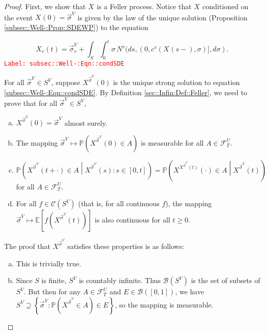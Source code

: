\documentclass[12pt]{article}
\newcommand{\mb}{\mathbb}
\newcommand{\mc}{\mathcal}
\newcommand{\ms}{\mathscr}
\newcommand{\tr}{\textcolor{red}}
\newcommand{\labe}[1]{\tr{\texttt{Label: #1}}}
\newcommand{\pr}{\mb{P}}							%
\newcommand{\ex}[1]{\mb{E}\left[#1\right]}			%
\renewcommand{\v}{v}							%
\renewcommand{\U}{U}							%
\renewcommand{\S}{S}							%
\newcommand{\s}{\sigma}							%
\newcommand{\sv}{\vec{\s}}						%
\newcommand{\T}{T}								%
\renewcommand{\t}{t}							%
\renewcommand{\tt}{s}							%
\newcommand{\F}{\mc{F}}							%
\newcommand{\X}{X}								%
\newcommand{\IGr}{c}							%
\newcommand{\vind}[1]{^{#1}}					%
\newcommand{\carp}[1]{^{#1}}					%
\newcommand{\vsi}[1]{^{#1}}						%
\newcommand{\cind}[1]{_{#1}}					%
\newcommand{\tp}[1]{(#1)}						%
\newcommand{\tip}[1]{#1}						%
\newcommand{\ts}[1]{_{#1}}						%
\newcommand{\cont}{\mc{C}}						%
\newcommand{\poiss}{N}							%
\newcommand{\pst}[1]{^{#1}}						%
\begin{document}
\begin{proof}
First, we show that \(\X\cind{}\tip{}\) is a Feller process. Notice that \(\X\cind{}\tip{}\) conditioned on the event \(\X\cind{}\tp{0} = \sv\cind{}\vsi{V}\) is given by the law of the unique solution (Proposition \ref{subsec::Well-:Prop::SDEWP}) to the equation

\begin{equation}
\X\cind{\v}\tp{\t} = \sv\cind{\v}\vsi{V} + \int_\S\int_0^\t \s\,\poiss\vind{\v}(d\tt,(0,\IGr\vind{\v}(\X\cind{}\tp{\tt-},\s)],d\s).
\label{subsec::Well-:Eqn::condSDE}
\end{equation}
\labe{subsec::Well-:Eqn::condSDE}

For all \(\sv\cind{}\vsi{V}\in\S\carp{V}\), suppose \(\X\pst{\sv\cind{}\vsi{V}}\cind{}\tp{0}\) is the unique strong solution to equation \eqref{subsec::Well-:Eqn::condSDE}. By Definition \ref{sec::Infin:Def::Feller}, we need to prove that for all \(\sv\cind{}\vsi{V}\in \S\carp{V}\),

\begin{enumerate}[(a)]
\item \(\X\pst{\sv\cind{}\vsi{V}}\cind{}\tp{0} = \sv\cind{}\vsi{V}\) almost surely.

\item The mapping \(\sv\cind{}\vsi{V}\mapsto \pr\left(\X\pst{\sv\cind{}\vsi{V}}\cind{}\tp{0}\in A\right)\) is measurable for all \(A\in \F\vsi{\U}\ts{\T}\).

\item \(\pr\left(\X\pst{\sv\cind{}\vsi{V}}\cind{}\tp{\t+\cdot}\in A\middle|\X\pst{\sv\cind{}\vsi{V}}\cind{}\tp{\tt}:\tt \in [0,\t]\right) = \pr\left(\X\pst{\X\pst{\sv\cind{}\vsi{V}}\cind{}\tp{\t}}\cind{}\tp{\cdot} \in A\middle| \X\pst{\sv\cind{}\vsi{V}}\cind{}\tp{\t} \right)\) for all \(A \in \F\vsi{\U}\ts{\T}\).

\item For all \(f \in \cont(\S\carp{V})\) (that is, for all continuous \(f\)), the mapping \(\sv\cind{}\vsi{V}\mapsto \ex{f(\X\pst{\sv\cind{}\vsi{V}}\cind{}\tp{\t})}\) is also continuous for all \(\t\geq 0\).
\end{enumerate}

The proof that \(\X\pst{\sv\cind{}\vsi{V}}\cind{}\tip{}\) satisfies these properties is as follows:

\begin{enumerate}[(a)]
\item This is trivially true.

\item Since \(\S\) is finite, \(\S\carp{V}\) is countably infinite. Thus \(\ms{B}(\S\carp{V})\) is the set of subsets of \(\S\carp{V}\). But then for any \(A \in \F\vsi{\U}\ts{\T}\) and \(E \in \ms{B}([0,1])\), we have \(\S\carp{V} \supseteq \left\{\sv\cind{}\vsi{V}: \pr\left(\X\pst{\sv\cind{}\vsi{V}}\cind{}\tip{} \in A\right) \in E\right\}\), so the mapping is measurable.


\end{enumerate}
\end{proof}
\end{document}
